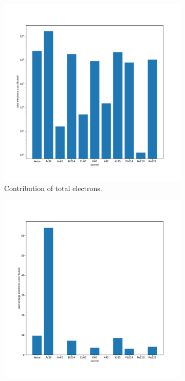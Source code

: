 \begin{figure}
\centering
\begin{subfigure}{.5\textwidth}
  \centering
  \includegraphics[width=\textwidth]{images/sim_electron_contribution_log.pdf}
  \caption{Contribution of total electrons.}
\end{subfigure}%
\begin{subfigure}{.5\textwidth}
  \centering
  \includegraphics[width=\textwidth]{images/sim_electron_contribution_percent.pdf}

\end{subfigure}
\end{figure}
